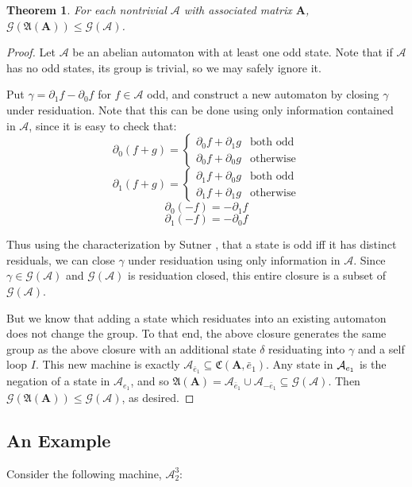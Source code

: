 \documentclass{article}
\newcommand{\A}{\mathcal{A}}
\newcommand{\G}{\mathcal{G}}
\renewcommand{\P}{\mathfrak{A}}
\newcommand{\2}{\textbf{2}}
\newcommand{\Am}{\textbf{A}}
\newcommand{\del}{\partial}
\newcommand{\e}{\bar{e}}
\newtheorem{thm}{Theorem}
\theoremstyle{definition}
\begin{document}
\begin{thm}
  For each nontrivial $\A$ with associated matrix $\Am$, 
  $\G(\P(\Am)) \leq \G(\A)$.
\end{thm}

\begin{proof}
  Let $\A$ be an abelian automaton with at least one odd state.
  Note that if $\A$ has no odd states, its group is trivial, so we may
  safely ignore it.

  Put $\gamma = \del_1 f - \del_0 f$ for $f \in \A$ odd, and construct
  a new automaton by closing $\gamma$ under residuation.
  Note that this can be done using only information contained in $\A$,
  since it is easy to check that:
  \[
    \del_0(f + g) = \begin{cases} \del_0 f + \del_1 g & \text{both odd}\\
                                  \del_0 f + \del_0 g & \text{otherwise}
                    \end{cases}
  \]
  \[
    \del_1(f + g) = \begin{cases} \del_1 f + \del_0 g & \text{both odd}\\
                                  \del_1 f + \del_1 g & \text{otherwise}
                    \end{cases}
  \]
  \[
    \del_0 (-f) = - \del_1 f
  \]
  \[
    \del_1 (-f) = - \del_0 f
  \]

  Thus using the characterization by Sutner \cite{Sutner18:abelian_automata}, 
  that a state is odd iff it has distinct residuals, we can close $\gamma$ 
  under residuation using only information in $\A$.
  Since $\gamma \in \G(\A)$ and $\G(\A)$ is residuation closed, 
  this entire closure is a subset of $\G(\A)$. 

  But we know that adding a state which residuates into an existing automaton 
  does not change the group. To that end, the above closure generates the same 
  group as the above closure with an additional state $\delta$ residuating into 
  $\gamma$ and a self loop $I$. This new machine is exactly 
  $\A_{\e_1} \subseteq \mathfrak{C}(\Am,\e_1)$. Any state in $\A_{\-e_1}$ is
  the negation of a state in $\A_{e_1}$, and so 
  $\P(\Am) = \A_{\e_1} \cup \A_{-\e_1} \subseteq \G(\A)$. 
  Then $\G(\P(\Am)) \leq \G(\A)$, as desired.
\end{proof}

\subsection{An Example}
Consider the following machine, $\A^3_2$:
\end{document}
